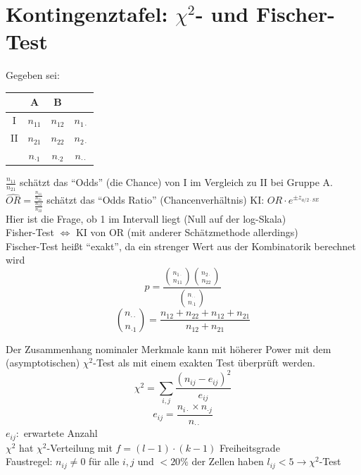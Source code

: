 \documentclass[10pt]{report}
\theoremstyle{definition}
\begin{document}
\section{Kontingenztafel: $\chi^2$- und Fischer-Test}
Gegeben sei:
\begin{tabular}{c|c|c|c}
	& A & B \\ \hline
	I & $n_{11}$ & $n_{12}$ & $n_{1\cdot}$ \\ \hline
	II & $n_{21}$ & $n_{22}$ & $n_{2\cdot}$ \\ \hline
	& $n_{\cdot1}$ & $n_{\cdot2}$ & $n_{\cdot\cdot}$
\end{tabular}
\newline
$\frac{n_{11}}{n_{21}}$ schätzt das ``Odds'' (die Chance) von I im Vergleich zu II bei Gruppe A. \\
$\widehat{OR}=\frac{\frac{n_{11}}{n_{21}}}{\frac{n_{12}}{n_{22}}}$ schätzt das ``Odds Ratio'' (Chancenverhältnis) KI: $OR \cdot e^{\pm z_{a/2 \cdot SE}}$ \\
Hier ist die Frage, ob 1 im Intervall liegt (Null auf der log-Skala)\\
Fisher-Test $\Leftrightarrow$ KI von OR (mit anderer Schätzmethode allerdings)  \\
Fischer-Test heißt ``exakt'', da ein strenger Wert aus der Kombinatorik berechnet wird
\[ p = \frac{\binom{n_{1\cdot}}{n_{11}} \binom{n_{2\cdot}}{n_{22}}}{ \binom{n_{\cdot \cdot}}{n_{\cdot1}}} \]
\[ \binom{n_{\cdot\cdot}}{n_{\cdot1}} = \frac{n_{12} + n_{22} + n_{12} + n_{21} }{n_{12} + n_{21} } \]

Der Zusammenhang nominaler Merkmale kann mit höherer Power mit dem (asymptotischen) $\chi^2$-Test als mit einem exakten Test überprüft werden.
\[ \chi^2 = \sum\limits_{i,j} \frac{(n_{ij} - e_{ij})^2}{e_{ij}} \]
\[ e_{ij}= \frac{n_{i\cdot} \times n_{\cdot j}}{n_{\cdot \cdot}} \]
$e_{ij}:$ erwartete Anzahl \\
$\chi^2$ hat $\chi^2$-Verteilung mit $f=(l-1)\cdot(k-1)$ Freiheitsgrade \\
Faustregel: $n_{ij} \neq 0$ für alle $i,j$ und $< 20 \%$ der Zellen haben $l_{ij} < 5 \rightarrow \chi^2$-Test \\
\end{document}
